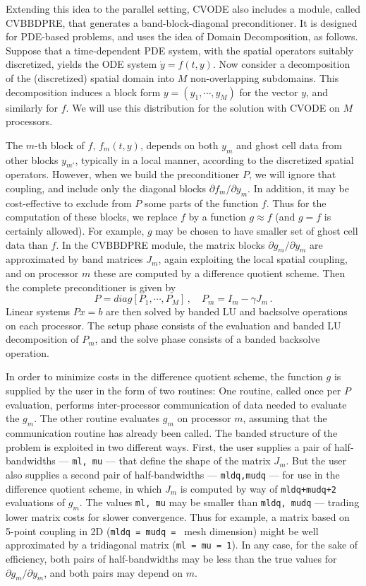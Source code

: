 Extending this idea to the parallel setting, CVODE also includes a
module, called CVBBDPRE, that generates a band-block-diagonal
preconditioner.  It is designed for PDE-based problems, and uses the
idea of Domain Decomposition, as follows.  Suppose that a
time-dependent PDE system, with the spatial operators suitably
discretized, yields the ODE system $\dot{y} = f(t,y)$.  Now consider a
decomposition of the (discretized) spatial domain into $M$
non-overlapping subdomains.  This decomposition induces a block form
$y = (y_1,\cdots,y_M)$ for the vector $y$, and similarly for $f$.  We
will use this distribution for the solution with CVODE on $M$
processors.

The $m$-th block of $f$, $f_m(t,y)$, depends on both $y_m$ and ghost
cell data from other blocks $y_{m'}$, typically in a local manner,
according to the discretized spatial operators.  However, when we
build the preconditioner $P$, we will ignore that coupling, and
include only the diagonal blocks $\partial f_m / \partial y_m$.  In
addition, it may be cost-effective to exclude from $P$ some parts of
the function $f$.  Thus for the computation of these blocks, we
replace $f$ by a function $g \approx f$ (and $g = f$ is certainly
allowed).  For example, $g$ may be chosen to have smaller set of ghost
cell data than $f$.  In the CVBBDPRE module, the matrix blocks
$\partial g_m/\partial y_m$ are approximated by band matrices $J_m$,
again exploiting the local spatial coupling, and on processor $m$
these are computed by a difference quotient scheme.  Then the complete
preconditioner is given by
\begin{equation*}
  P = diag[P_1,\cdots,P_M] \, , \quad 
  P_m = I_m - \gamma J_m \, . 
\end{equation*}
Linear systems $Px = b$ are then solved by banded LU and backsolve
operations on each processor.  The setup phase consists of the
evaluation and banded LU decomposition of $P_m$, and the solve phase
consists of a banded backsolve operation.

In order to minimize costs in the difference quotient scheme, the
function $g$ is supplied by the user in the form of two routines: One
routine, called once per $P$ evaluation, performs inter-processor
communication of data needed to evaluate the $g_m$.  The other routine
evaluates $g_m$ on processor $m$, assuming that the communication
routine has already been called.  The banded structure of the problem
is exploited in two different ways.  First, the user supplies a pair of
half-bandwidths --- {\tt ml, mu} --- that define the shape of the
matrix $J_m$.  But the user also supplies a second pair of
half-bandwidths --- {\tt mldq,mudq} --- for use in the difference
quotient scheme, in which $J_m$ is computed by way of 
{\tt mldq+mudq+2} evaluations of $g_m$.  The values {\tt ml, mu} may be
smaller than {\tt mldq, mudq} --- trading lower matrix costs for slower
convergence.  Thus for example, a matrix based on 5-point coupling in
2D ({\tt mldq = mudq = } mesh dimension) might be well approximated by
a tridiagonal matrix ({\tt ml = mu = 1}).  In any case, for the sake
of efficiency, both pairs of half-bandwidths may be less than the true
values for $\partial g_m /\partial y_m$, and both pairs may depend on
$m$.

